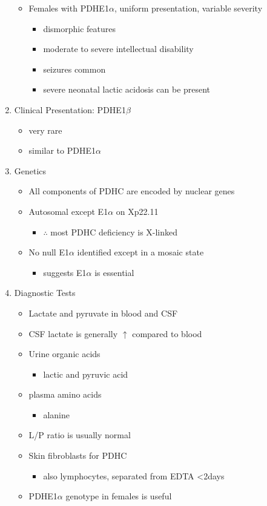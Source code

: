 \documentclass{scrartcl}
\begin{document}
\begin{enumerate}
\begin{itemize}
\item Females with PDHE1\(\alpha\), uniform presentation, variable severity
\begin{itemize}
\item dismorphic features
\item moderate to severe intellectual disability
\item seizures common
\item severe neonatal lactic acidosis can be present
\end{itemize}
\end{itemize}

\item Clinical Presentation: PDHE1\(\beta\)
\label{sec:org4c4df9c}
\begin{itemize}
\item very rare
\item similar to PDHE1\(\alpha\)
\end{itemize}

\item Genetics
\label{sec:orga6885d2}
\begin{itemize}
\item All components of PDHC are encoded by nuclear genes
\item Autosomal except E1\(\alpha\) on Xp22.11
\begin{itemize}
\item \(\therefore\) most PDHC deficiency is X-linked
\end{itemize}
\item No null E1\(\alpha\) identified except in a mosaic state
\begin{itemize}
\item suggests E1\(\alpha\) is essential
\end{itemize}
\end{itemize}

\item Diagnostic Tests
\label{sec:org45c82cb}
\begin{itemize}
\item Lactate and pyruvate in blood and CSF
\item CSF lactate is generally \(\uparrow\) compared to blood
\item Urine organic acids
\begin{itemize}
\item lactic and pyruvic acid
\end{itemize}
\item plasma amino acids
\begin{itemize}
\item alanine
\end{itemize}
\item L/P ratio is usually normal
\item Skin fibroblasts for PDHC
\begin{itemize}
\item also lymphocytes, separated from EDTA <2days
\end{itemize}
\item PDHE1\(\alpha\) genotype in females is useful
\end{itemize}


\end{enumerate}
\end{document}
